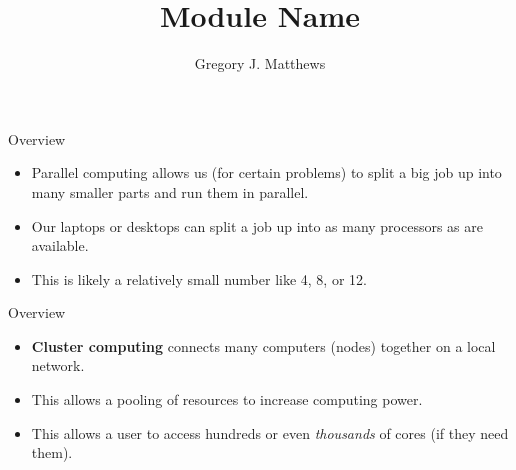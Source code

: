 

\title{Module Name}
\newcommand{\ModuleShortname}{shortName}
\author{Gregory J. Matthews}
\newcommand{\LicenseText}{Made available under the Creative Commons Attribution-ShareAlike 3.0 Unported License: http://creativecommons.org/licenses/by-sa/3.0/deed.en\textunderscore US }
\newcommand{\Instructor}{}
\newcommand{\Course}{}






\begin{frame}[plain]
	\titlepage
\end{frame}

\begin{frame}{Overview}
\begin{itemize}
\item Parallel computing allows us (for certain problems) to split a big job up into many smaller parts and run them in parallel.  
\item Our laptops or desktops can split a job up into as many processors as are available.  
\item This is likely a relatively small number like 4, 8, or 12. 
 \end{itemize}
\end{frame}

\begin{frame}{Overview}
\begin{itemize}
\item {\bf Cluster computing} connects many computers (nodes) together on a local network. 
\item This allows a pooling of resources to increase computing power.
\item This allows a user to access hundreds or even {\it thousands} of cores (if they need them). 
\end{itemize}
\end{frame}

